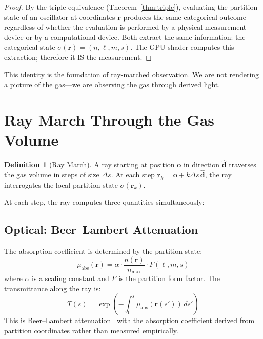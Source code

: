 \documentclass[twocolumn,10pt,a4paper]{article}
\theoremstyle{plain}
\theoremstyle{definition}
\newtheorem{definition}[theorem]{Definition}
\theoremstyle{remark}
\begin{document}
\begin{proof}
By the triple equivalence (Theorem~\ref{thm:triple}), evaluating the partition state of an oscillator at coordinates $\mathbf{r}$ produces the same categorical outcome regardless of whether the evaluation is performed by a physical measurement device or by a computational device. Both extract the same information: the categorical state $\sigma(\mathbf{r}) = (n, \ell, m, s)$. The GPU shader computes this extraction; therefore it IS the measurement.
\end{proof}

This identity is the foundation of ray-marched observation. We are not rendering a picture of the gas---we are observing the gas through derived light.

\section{Ray March Through the Gas Volume}
\label{sec:ray_march}

\begin{definition}[Ray March]
A ray starting at position $\mathbf{o}$ in direction $\hat{\mathbf{d}}$ traverses the gas volume in steps of size $\Delta s$. At each step $\mathbf{r}_k = \mathbf{o} + k\Delta s\,\hat{\mathbf{d}}$, the ray interrogates the local partition state $\sigma(\mathbf{r}_k)$.
\end{definition}

At each step, the ray computes three quantities simultaneously:

\subsection{Optical: Beer--Lambert Attenuation}

The absorption coefficient is determined by the partition state:
\begin{equation}
    \mu_{\mathrm{abs}}(\mathbf{r}) = \alpha \cdot \frac{n(\mathbf{r})}{n_{\max}} \cdot F(\ell, m, s)
\end{equation}
where $\alpha$ is a scaling constant and $F$ is the partition form factor. The transmittance along the ray is:
\begin{equation}
    T(s) = \exp\!\left(-\int_0^s \mu_{\mathrm{abs}}(\mathbf{r}(s'))\, ds'\right)
\end{equation}
This is Beer--Lambert attenuation~\cite{beer1852} with the absorption coefficient derived from partition coordinates rather than measured empirically.
\end{document}
